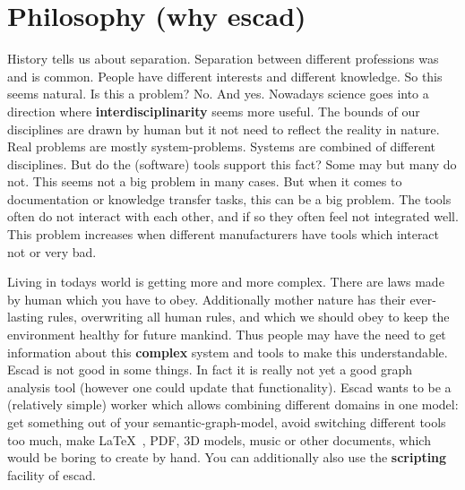 \documentclass[a4paper, 12pt, openany]{scrbook}
\begin{document}
\section{Philosophy (why escad)}
History tells us about separation. Separation between different professions was and is common. People have different interests and different knowledge. So this seems natural. Is this a problem? No. And yes. Nowadays science goes into a direction where \textbf{interdisciplinarity} seems more useful. The bounds of our disciplines are drawn by human but it not need to reflect the reality in nature. Real problems are mostly system-problems. Systems are combined of different disciplines. But do the (software) tools support this fact? Some may but many do not. This seems not a big problem in many cases. But when it comes to documentation or knowledge transfer tasks, this can be a big problem. The tools often do not interact with each other, and if so they often feel not integrated well. This problem increases when different manufacturers have tools which interact not or very bad.

Living in todays world is getting more and more complex. There are laws made by human which you have to obey. Additionally mother nature has their ever-lasting rules, overwriting all human rules, and which we should obey to keep the environment healthy for future mankind. Thus people may have the need to get information about this \textbf{complex} system and tools to make this understandable. Escad is not good in some things. In fact it is really not yet a good graph analysis tool (however one could update that functionality). Escad wants to be a (relatively simple) worker which allows combining different domains in one model: get something out of your semantic-graph-model, avoid switching different tools too much, make \LaTeX\ , PDF, 3D models, music or other documents, which would be boring to create by hand. You can additionally also use the \textbf{scripting} facility of escad.
\end{document}
